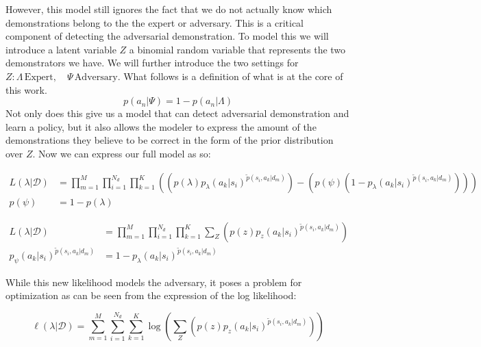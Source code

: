 \documentclass[11pt]{article}
\newcommand{\data}{\mathcal{D}}
\begin{document}
However, this model still ignores the fact that we do not actually know which demonstrations belong to the the expert or adversary. This is a critical component of detecting the adversarial demonstration. To model this we will introduce a latent variable $Z$ a binomial random variable that represents the two demonstrators we have. We will further introduce the two settings for $Z: \Lambda \, \text{Expert}, \quad  \Psi \, \text{Adversary}$. What follows is a definition of what is at the core of this work.
\begin{equation}
    \label{compliment}
    p(a_{n}| \Psi) = 1 - p(a_{n}|\Lambda)
\end{equation}
\quad Not only does this give us a model that can detect adversarial demonstration and learn a policy, but it also allows the modeler  to express the amount of the demonstrations they believe to be correct in the form of the prior distribution over $Z$. Now we can express our full model as so:

\begin{equation} \label{full_likelihood}
    \begin{aligned}
       L(\lambda | \data) &=  \prod_{m=1}^{M}\prod_{i=1}^{N_{d}} \prod_{k=1}^{K} \left( \left( p(\lambda)p_{\lambda}(a_{k}|s_{i})^{\widetilde{p}(s_{i}, a_{k}| d_{m})}  \right)- \left(
       p(\psi)(1-p_{\lambda}(a_{k}|s_{i})^{\widetilde{p}(s_{i}, a_{k}| d_{m})})\right)
        \right)\\
        p(\psi) &= 1 - p(\lambda)
    \end{aligned}
\end{equation}

\begin{equation} \label{concise_likelihood}
    \begin{aligned}
       L(\lambda| \data) &=  \prod_{m=1}^{M}\prod_{i=1}^{N_{d}} \prod_{k=1}^{K} \sum_{Z} \left( p(z)p_{z}(a_{k}|s_{i})^{\widetilde{p}(s_{i}, a_{k}| d_{m})} \right) \\
       p_{\psi}(a_{k}|s_{i})^{\widetilde{p}(s_{i}, a_{k}| d_{m})} &= 1 - p_{\lambda}(a_{k}|s_{i})^{\widetilde{p}(s_{i}, a_{k}| d_{m})}
    \end{aligned}
\end{equation}

\FloatBarrier
While this new likelihood models the adversary, it poses a problem for optimization as can be seen from the expression of the log likelihood:

\begin{equation} \label{concie_log_likelihood}
       \ell(\lambda| \data) =  \sum_{m=1}^{M}\sum_{i=1}^{N_{d}} \sum_{k=1}^{K} \log \left( \sum_{Z} \left( p(z)p_{z}(a_{k}|s_{i})^{\widetilde{p}(s_{i}, a_{k}| d_{m})} \right) \right) 
\end{equation}
\end{document}
